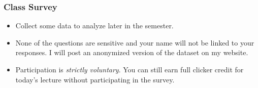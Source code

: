 \documentclass[handout]{beamer}
\date{Lecture \# 2}
\begin{document}
 





\begin{frame}[plain]
	\titlepage 
	

\end{frame} 
%





\begin{frame}\frametitle{Class Survey}
 
\begin{itemize}
	\item Collect some data to analyze later in the semester.
	\item None of the questions are sensitive and your name will not be linked to your responses. I will post an anonymized version of the dataset on my website.
	\item Participation is  \emph{strictly voluntary}. You can still earn full clicker credit for today's lecture without participating in the survey.
\end{itemize}


\end{frame}
\end{document}
